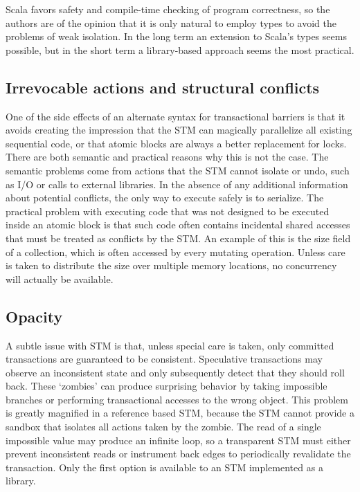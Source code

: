 Scala favors safety and compile-time checking of program correctness,
so the authors are of the opinion that it is only natural to employ types
to avoid the problems of weak isolation.  In the long term an extension
to Scala's types seems possible, but in the short term a library-based
approach seems the most practical.

\subsection{Irrevocable actions and structural conflicts}

One of the side effects of an alternate syntax for transactional barriers
is that it avoids creating the impression that the STM can magically
parallelize all existing sequential code, or that atomic blocks are
always a better replacement for locks.  There are both semantic and
practical reasons why this is not the case.  The semantic problems come
from actions that the STM cannot isolate or undo, such as I/O or calls to
external libraries.  In the absence of any additional information about
potential conflicts, the only way to execute safely is to serialize.
The practical problem with executing code that was not designed to
be executed inside an atomic block is that such code often contains
incidental shared accesses that must be treated as conflicts by the STM.
An example of this is the size field of a collection, which is often
accessed by every mutating operation.  Unless care is taken to distribute
the size over multiple memory locations, no concurrency will actually
be available.

\subsection{Opacity}

A subtle issue with STM is that, unless special care is taken, only
committed transactions are guaranteed to be consistent.  Speculative
transactions may observe an inconsistent state and only subsequently
detect that they should roll back.  These `zombies' can produce
surprising behavior by taking impossible branches or performing
transactional accesses to the wrong object.  This problem is greatly
magnified in a reference based STM, because the STM cannot provide a
sandbox that isolates all actions taken by the zombie.  The read of a
single impossible value may produce an infinite loop, so a transparent
STM must either prevent inconsistent reads or instrument back edges
to periodically revalidate the transaction.  Only the first option is
available to an STM implemented as a library.

